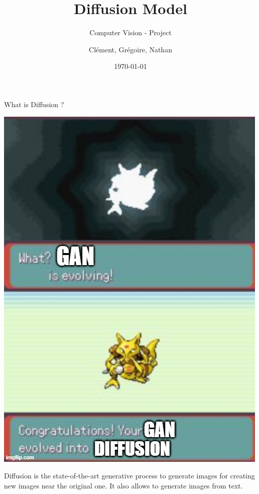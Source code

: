 \documentclass{beamer}
\begin{document}
\title{Diffusion Model}
\subtitle{Computer Vision - Project}
\author{Clément, Grégoire, Nathan}
\date{\today}

\maketitle
\begin{frame}{What is Diffusion ?}
    \begin{minipage}[c]{0.5\textwidth}
        \centering
        \includegraphics[width=\textwidth]{imgs/evolution_meme.jpg}
    \end{minipage}%
    \hfill
    \begin{minipage}[c]{0.35\textwidth}
        \alert{Diffusion} is the \alert{state-of-the-art} generative process to generate images for creating \alert{new images near the original one}.  
        It also allows to \alert{generate images from text}.
    \end{minipage}
\end{frame}
\end{document}
